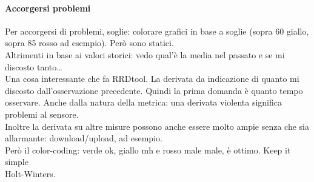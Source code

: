 \documentclass[10pt]{book}
\begin{document}
\paragraph{Accorgersi problemi} Per accorgersi di problemi, soglie: colorare grafici in base a soglie (sopra 60 giallo, sopra 85 rosso ad esempio). Però sono statici.\\
Altrimenti in base ai valori storici: vedo qual'è la media nel passato e se mi discosto tanto\ldots\\
Una cosa interessante che fa RRDtool. La derivata da indicazione di quanto mi discosto dall'osservazione precedente. Quindi la prima domanda è quanto tempo osservare. Anche dalla natura della metrica: una derivata violenta significa problemi al sensore.\\
Inoltre la derivata su altre misure possono anche essere molto ampie senza che sia allarmante: download/upload, ad esempio.\\
Però il color-coding: verde ok, giallo mh e rosso male male, è ottimo. Keep it simple\\
Holt-Winters.\\\\
\end{document}
